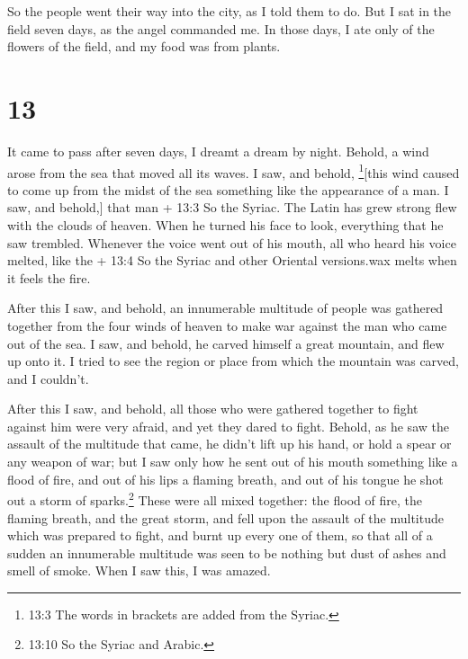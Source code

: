  So the people went their way into the city, as I told them
to do.  But I sat in the field seven days, as the angel
commanded me. In those days, I ate only of the flowers of the field, and
my food was from plants.

\hypertarget{section-12}{%
\section{13}\label{section-12}}

 It came to pass after seven days, I dreamt a dream by
night.  Behold, a wind arose from the sea that moved all its
waves.  I saw, and behold, \footnote{13:3 The words in
  brackets are added from the Syriac.}{[}this wind caused to come up
from the midst of the sea something like the appearance of a man. I saw,
and behold,{]} that man + 13:3 So the Syriac. The Latin has grew strong
flew with the clouds of heaven. When he turned his face to look,
everything that he saw trembled.  Whenever the voice went
out of his mouth, all who heard his voice melted, like the + 13:4 So the
Syriac and other Oriental versions.wax melts when it feels the fire.

 After this I saw, and behold, an innumerable multitude of
people was gathered together from the four winds of heaven to make war
against the man who came out of the sea.  I saw, and behold,
he carved himself a great mountain, and flew up onto it.  I
tried to see the region or place from which the mountain was carved, and
I couldn't.

 After this I saw, and behold, all those who were gathered
together to fight against him were very afraid, and yet they dared to
fight.  Behold, as he saw the assault of the multitude that
came, he didn't lift up his hand, or hold a spear or any weapon of war;
 but I saw only how he sent out of his mouth something like
a flood of fire, and out of his lips a flaming breath, and out of his
tongue he shot out a storm of sparks.\footnote{13:10 So the Syriac and
  Arabic.}  These were all mixed together: the flood of
fire, the flaming breath, and the great storm, and fell upon the assault
of the multitude which was prepared to fight, and burnt up every one of
them, so that all of a sudden an innumerable multitude was seen to be
nothing but dust of ashes and smell of smoke. When I saw this, I was
amazed.

